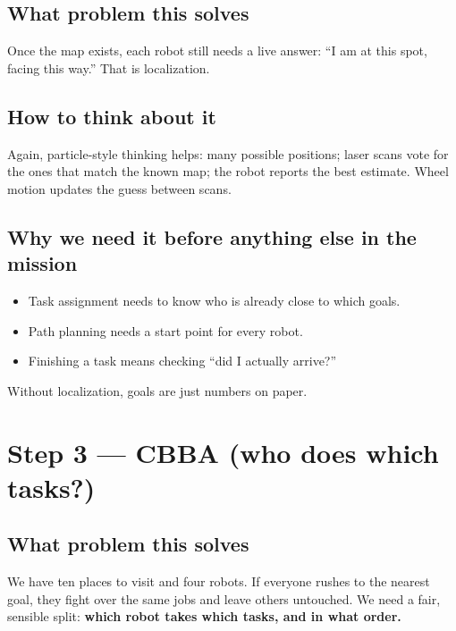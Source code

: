 \documentclass[11pt,a4paper]{article}
\begin{document}
\subsection{What problem this solves}

Once the map exists, each robot still needs a live answer: ``I am at this
spot, facing this way.'' That is localization.

\subsection{How to think about it}

Again, particle-style thinking helps: many possible positions; laser scans
vote for the ones that match the known map; the robot reports the best
estimate. Wheel motion updates the guess between scans.

\subsection{Why we need it before anything else in the mission}

\begin{itemize}[leftmargin=*]
  \item Task assignment needs to know who is already close to which goals.
  \item Path planning needs a start point for every robot.
  \item Finishing a task means checking ``did I actually arrive?''
\end{itemize}

Without localization, goals are just numbers on paper.

\section{Step 3 --- CBBA (who does which tasks?)}

\subsection{What problem this solves}

We have ten places to visit and four robots. If everyone rushes to the
nearest goal, they fight over the same jobs and leave others untouched. We
need a fair, sensible split: \textbf{which robot takes which tasks, and in
what order.}
\end{document}
